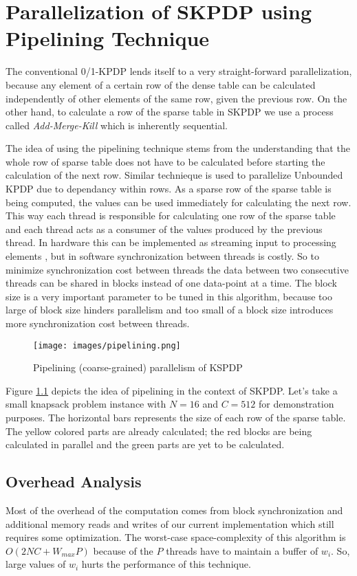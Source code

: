 \chapter{Parallelization of SKPDP using Pipelining Technique}
\label{chap:pipeline}

The conventional 0/1-KPDP lends itself to a very straight-forward parallelization, because any element of a certain row of the dense table can be calculated independently of other elements of the same row, given the previous row. On the other hand, to calculate a row of the sparse table in SKPDP we use a process called \textit{Add-Merge-Kill} which is inherently sequential.

The idea of using the pipelining technique stems from the understanding that the whole row of sparse table does not have to be calculated before starting the calculation of the next row. Similar technieque is used to parallelize Unbounded KPDP \cite{Rashid2010AnEO} due to dependancy within rows. As a sparse row of the sparse table is being computed, the values can be used immediately for calculating the next row. This way each thread is responsible for calculating one row of the sparse table and each thread acts as a consumer of the values produced by the previous thread. In hardware this can be implemented as streaming input to processing elements \cite{sanjay-asap94}, but in software synchronization between threads is costly. So to minimize synchronization cost between threads the data between two consecutive threads can be shared in blocks instead of one data-point at a time. The block size is a very important parameter to be tuned in this algorithm, because too large of block size hinders parallelism and too small of a block size introduces more synchronization cost between threads.


\begin{figure}[htbp]
\centerline{\texttt{[image: images/pipelining.png]}}
\caption{Pipelining (coarse-grained) parallelism of KSPDP }
\label{fig:pipeline}
\end{figure}

Figure \ref{fig:pipeline} depicts the idea of pipelining in the context of SKPDP. Let's take a small knapsack problem instance with $N=16$ and $C=512$ for demonstration purposes. The horizontal bars represents the size of each row of the sparse table. The yellow colored parts are already calculated; the red blocks are being calculated in parallel and the green parts are yet to be calculated.

\section{Overhead Analysis} 
Most of the overhead of the computation comes from block synchronization and additional memory reads and writes of our current implementation which still requires some optimization. The worst-case space-complexity of this algorithm is $O(2NC + W_{max}P)$ because of the $P$ threads have to maintain a buffer of $w_i$. So, large values of $w_i$ hurts the performance of this technique.



